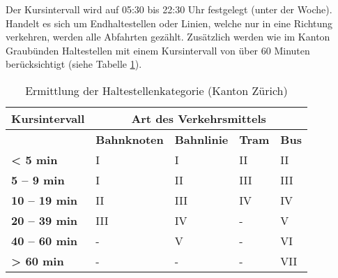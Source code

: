 Der Kursintervall wird auf 05:30 bis 22:30 Uhr festgelegt (unter der Woche).
Handelt es sich um Endhaltestellen oder Linien, welche nur in eine Richtung verkehren, werden alle Abfahrten gezählt.
Zusätzlich werden wie im Kanton Graubünden  Haltestellen mit einem Kursintervall von über 60 Minuten berücksichtigt (siehe Tabelle \ref{table:Ermittlung der Haltestellenkategorie (Kanton Zürich)}).

\begin{table}[ht]
    \begin{tabular}[c]{l p{2.9cm} p{2.8cm} p{2.8cm} p{2.8cm}}
        \toprule
        \textbf{Kursintervall}
                                & \multicolumn{4}{c}{\textbf{Art des Verkehrsmittels}}\\
        \midrule
        \textbf{}
                                & \textbf{Bahnknoten}
                                & \textbf{Bahnlinie}
                                & \textbf{Tram}
                                & \textbf{Bus}\\
        \textbf{< 5 min}
                                & I
                                & I
                                & II
                                & II\\
        \textbf{5 -- 9 min}
                                & I
                                & II
                                & III
                                & III\\
        \textbf{10 -- 19 min}
                                & II
                                & III
                                & IV
                                & IV\\
        \textbf{20 -- 39 min}
                                & III
                                & IV
                                & -
                                & V\\
        \textbf{40 -- 60 min}
                                & -
                                & V
                                & -
                                & VI\\
        \cellcolor{red!25}\textbf{> 60 min}
                                & -
                                & -
                                & -
                                & \cellcolor{red!25}VII\\
        \bottomrule
    \end{tabular}
    \caption{Ermittlung der Haltestellenkategorie (Kanton Zürich)}
    \label{table:Ermittlung der Haltestellenkategorie (Kanton Zürich)}
\end{table}


